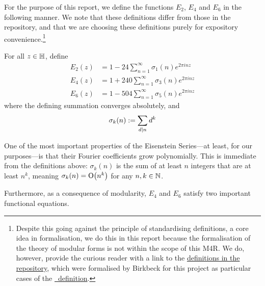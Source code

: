 For the purpose of this report, we define the functions $E_2$, $E_4$ and $E_6$ in the following manner. We note that these definitions differ from those in the repository, and that we are choosing these definitions purely for expository convenience.\footnote{{Despite this going against the principle of standardising definitions, a core idea in formalisation, we do this in this report because the formalisation of the theory of modular forms is not within the scope of this M4R. We do, however, provide the curious reader with a link to the \href{https://github.com/thefundamentaltheor3m/Sphere-Packing-Lean/blob/704c085b1251cc0c208cc373f4e6105af359edd4/SpherePacking/ModularForms/Eisenstein.lean\#L28}{definitions in the repository}, which were formalised by Birkbeck for this project as particular cases of the \href{https://github.com/leanprover-community/mathlib4/blob/70816aec3a0f7bb98ac42991652a66b6405e1a00/Mathlib/NumberTheory/ModularForms/EisensteinSeries/Basic.lean\#L28-L35}{\mathlib\ definition}.}}

\begin{boxdefinition}\label{Ch2:Def:E2_E3_E4}
    For all $z \in \mathbb{H}$, define
    \begin{align}
        E_2(z) &= 1 - 24 \sum_{n=1}^{\infty} \sigma_1(n) e^{2 \pi i n z} \label{Ch2:Eq:E2_qexpansion} \\
        E_4(z) &= 1 + 240 \sum_{n=1}^{\infty} \sigma_3(n) e^{2 \pi i n z} \label{Ch2:Eq:E4_qexpansion} \\
        E_6(z) &= 1 - 504 \sum_{n=1}^{\infty} \sigma_5(n) e^{2 \pi i n z} \label{Ch2:Eq:E6_qexpansion}
    \end{align}
    where the defining summation converges absolutely, and
    \begin{align*}
        \sigma_k\!\left( n \right) := \sum_{d \mid n} d^k
    \end{align*}
\end{boxdefinition}

One of the most important properties of the Eisenstein Series---at least, for our purposes---is that their Fourier coefficients grow polynomially. This is immediate from the definitions above: $\sigma_k(n)$ is the sum of at least $n$ integers that are at least $n^k$, meaning $\sigma_k(n) = \operatorname{O}\!\left( n^{k} \right)$ for any $n, k \in \mathbb{N}$.

Furthermore, as a consequence of modularity, $E_4$ and $E_6$ satisfy two important functional equations.

